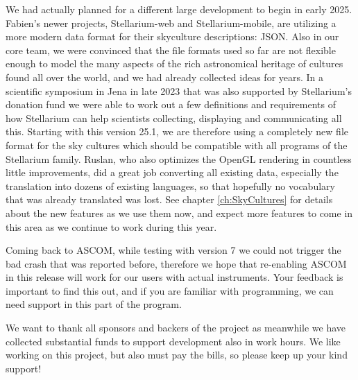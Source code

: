 We had actually planned for a different large development to begin in early 2025. Fabien's newer projects, Stellarium-web and Stellarium-mobile, 
are utilizing a more modern data format for their skyculture descriptions: JSON. Also in our core team, 
we were convinced that the file formats used so far are not flexible enough to model the many aspects of the rich astronomical 
heritage of cultures found all over the world, and we had already collected ideas for years. 
In a scientific symposium in Jena in late 2023 that was also supported by Stellarium's donation 
fund we were able to work out a few definitions and requirements of how Stellarium can help scientists collecting, displaying and communicating 
all this. Starting with this version 25.1, we are therefore using a completely new file format for the sky 
cultures which should be compatible with all programs of the Stellarium family. 
Ruslan, who also optimizes the OpenGL rendering in countless little improvements, did a great job converting all existing data, 
especially the translation into dozens of existing languages, so that hopefully no vocabulary that was already translated was lost.  
See chapter \ref{ch:SkyCultures} for details about the new features as we use them now, 
and expect more features to come in this area as we continue to work during this year. 

Coming back to ASCOM, while testing with version 7 we could not trigger the bad crash that was reported before, 
therefore we hope that re-enabling ASCOM in this release will work for our users with actual instruments. 
Your feedback is important to find this out, and if you are familiar with programming, we can need support in this part of the program. 

We want to thank all sponsors and backers of the project as meanwhile we have collected substantial funds to support development 
also in work hours. We like working on this project, but also must pay the bills, so please keep up your kind support! 


\iffalse
If that was not enough, yet another contributor, Wang Siliang, has fulfilled a long-standing 
desire for quite a few astrophotographers.  He created a plugin with which you can place your own 
photos inside Stellarium, with just a few mouseclicks and connection to astrometry.net.

Have you ever wondered what the actual size of the focal area was for the modern generation of automated survey telescopes?  
Thanks to yet another external contribution by Josh Meyers, a professional astronomer involved in commissioning 
the Vera C. Rubin telescope, his plugin that he developed and used during this commissioning can show the sensor grid of 
this and other telescopes, and you can even configure your own. 
\fi


